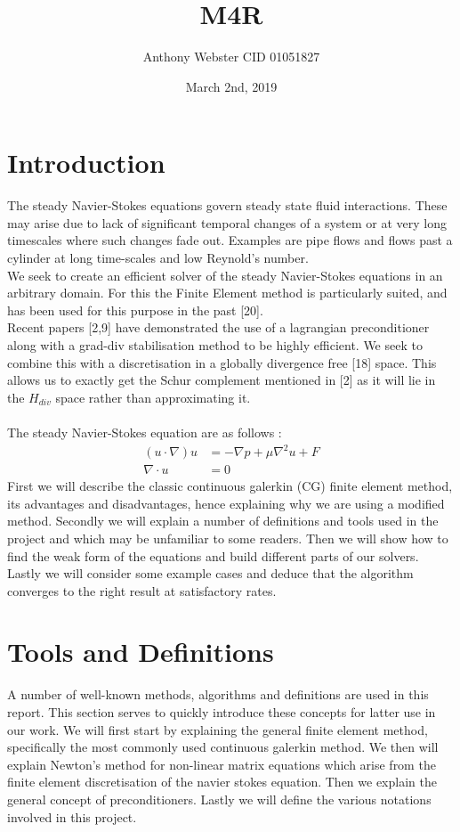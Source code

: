 \documentclass[11pt,twoside,a4paper]{article}
\begin{document}
\setcounter{secnumdepth}{4}
\title{M4R}
\date{March 2nd, 2019}
\author{Anthony Webster CID 01051827}
\maketitle

\tableofcontents

\section{Introduction}
The steady Navier-Stokes equations govern steady state fluid interactions. These may arise due to lack of significant temporal changes of a system or at very long timescales where such changes fade out. Examples are pipe flows and flows past a cylinder at long time-scales and low Reynold's number.\\
We seek to create an efficient solver of the steady Navier-Stokes equations in an arbitrary domain. For this the Finite Element method is particularly suited, and has been used for this purpose in the past [20]. \\
Recent papers [2,9] have demonstrated the use of a lagrangian preconditioner along with a grad-div stabilisation method to be highly efficient. We seek to combine this with a discretisation in a globally divergence free [18] space. This allows us to exactly get the Schur complement mentioned in [2] as it will lie in the $H_{div}$ space rather than approximating it.\\
\\
The steady Navier-Stokes equation are as follows :
\begin{align}
(u \cdot \nabla) u &= -\nabla p + \mu \nabla^2 u + F \\
\nabla \cdot u &= 0
\end{align}
First we will describe the classic continuous galerkin (CG) finite element method, its advantages and disadvantages, hence explaining why we are using a modified method. Secondly we will explain a number of definitions and tools used in the project and which may be unfamiliar to some readers. Then we will show how to find the weak form of the equations and build different parts of our solvers. Lastly we will consider some example cases and deduce that the algorithm converges to the right result at satisfactory rates.\\

\section{Tools and Definitions}
A number of well-known methods, algorithms and definitions are used in this report. This section serves to quickly introduce these concepts for latter use in our work. We will first start by explaining the general finite element method, specifically the most commonly used continuous galerkin method. We then will explain Newton's method for non-linear matrix equations which arise from the finite element discretisation of the navier stokes equation. Then we explain the general concept of preconditioners. Lastly we will define the various notations involved in this project.
\end{document}
